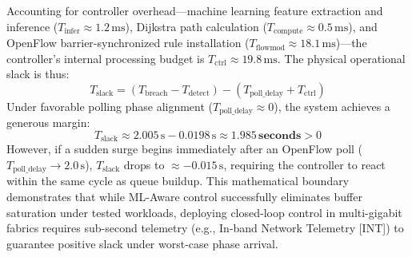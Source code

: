 Accounting for controller overhead—machine learning feature extraction and inference ($T_{\text{infer}} \approx 1.2\,\text{ms}$), Dijkstra path calculation ($T_{\text{compute}} \approx 0.5\,\text{ms}$), and OpenFlow barrier-synchronized rule installation ($T_{\text{flowmod}} \approx 18.1\,\text{ms}$)—the controller's internal processing budget is $T_{\text{ctrl}} \approx 19.8\,\text{ms}$. The physical operational slack is thus:
\begin{equation}
  T_{\text{slack}} = (T_{\text{breach}} - T_{\text{detect}}) - (T_{\text{poll\_delay}} + T_{\text{ctrl}})
\end{equation}
Under favorable polling phase alignment ($T_{\text{poll\_delay}} \approx 0$), the system achieves a generous margin:
\begin{equation}
  T_{\text{slack}} \approx 2.005\,\text{s} - 0.0198\,\text{s} \approx \mathbf{1.985\,\text{seconds}} > 0
\end{equation}
However, if a sudden surge begins immediately after an OpenFlow poll ($T_{\text{poll\_delay}} \to 2.0\,\text{s}$), $T_{\text{slack}}$ drops to $\approx -0.015\,\text{s}$, requiring the controller to react within the same cycle as queue buildup. This mathematical boundary demonstrates that while ML-Aware control successfully eliminates buffer saturation under tested workloads, deploying closed-loop control in multi-gigabit fabrics requires sub-second telemetry (e.g., In-band Network Telemetry [INT]) to guarantee positive slack under worst-case phase arrival.
